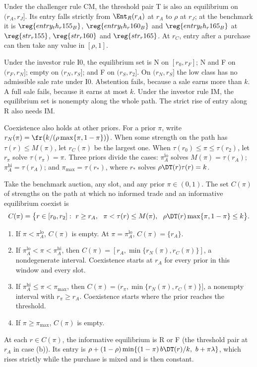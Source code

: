 \begin{remark}\label{rem:ties}
Under the challenger rule CM, the threshold pair T is also an equilibrium on \((r_A,r_J]\). Its entry falls strictly
from \(\Ent_R(r_A)\) at \(r_A\) to \(\rho\) at \(r_J\); at the benchmark it is \(\reg{entry_th_r155_B}\),
\(\reg{entry_th_r160_B}\) and \(\reg{entry_th_r165_B}\) at \(\reg{str_r155}\), \(\reg{str_r160}\) and
\(\reg{str_r165}\). At \(r_C\), entry after a purchase can then take any value in \([\rho,1]\). 

Under the investor rule I0, the equilibrium set is N on \([r_0,r_F]\); N and F on \((r_F,r_N]\); empty on \((r_N,r_S]\); and F on
\((r_S,r_2]\). On \((r_N,r_S]\) the low class has no admissible sale rate under I0. Abstention fails, because a
sale earns more than \(k\). A full sale fails, because it earns at most \(k\). Under the investor rule IM, the
equilibrium set is nonempty along the whole path. The strict rise of entry along R also needs IM.
\end{remark}

Coexistence also holds at other priors. For a prior \(\pi\), write \(r_N(\pi)=\fr\bigl(k/(\rho\max\{\pi,1-\pi\})\bigr)\).
When some strength on the path has \(\tau(r)\le M(\pi)\), let \(r_C(\pi)\) be the largest one. When
\(\tau(r_0)\le\pi\le\tau(r_2)\), let \(r_\pi\) solve \(\tau(r_\pi)=\pi\). Three priors divide the cases: \(\pi_A^{\mathrm{lo}}\) solves
\(M(\pi)=\tau(r_A)\); \(\pi_A^{\mathrm{hi}}=\tau(r_A)\); and \(\pi_{\max}=\tau(r_*)\), where \(r_*\) solves
\(\rho\DT(r)\tau(r)=k\).

\begin{corollary}\label{prop:priors}
Take the benchmark auction, any slot, and any prior \(\pi\in(0,1)\). The set \(C(\pi)\) of strengths on the path
at which no informed trade and an informative equilibrium coexist is
\[
C(\pi)=\bigl\{r\in[r_0,r_2]:\ r\ge r_A,\ \ \pi<\tau(r)\le M(\pi),\ \ \rho\DT(r)\max\{\pi,1-\pi\}\le k\bigr\}.
\]
\begin{enumerate}[label=(\alph*),leftmargin=2em]
\item If \(\pi<\pi_A^{\mathrm{lo}}\), \(C(\pi)\) is empty. At \(\pi=\pi_A^{\mathrm{lo}}\), \(C(\pi)=\{r_A\}\).
\item If \(\pi_A^{\mathrm{lo}}<\pi<\pi_A^{\mathrm{hi}}\), then \(C(\pi)=[r_A,\min\{r_N(\pi),r_C(\pi)\}]\), a
nondegenerate interval. Coexistence starts at \(r_A\) for every prior in this window and every slot.
\item If \(\pi_A^{\mathrm{hi}}\le\pi<\pi_{\max}\), then \(C(\pi)=(r_\pi,\min\{r_N(\pi),r_C(\pi)\}]\), a nonempty
interval with \(r_\pi\ge r_A\). Coexistence starts where the prior reaches the threshold.
\item If \(\pi\ge\pi_{\max}\), \(C(\pi)\) is empty.
\end{enumerate}
At each \(r\in C(\pi)\), the informative equilibrium is R or F (the threshold pair at \(r_A\) in case (b)). Its
entry is \(\rho+(1-\rho)\min\{(1-\pi)\,b\DT(r)/k,\ b+\pi\lambda\}\), which rises strictly while the purchase is
mixed and is then constant.
\end{corollary}

